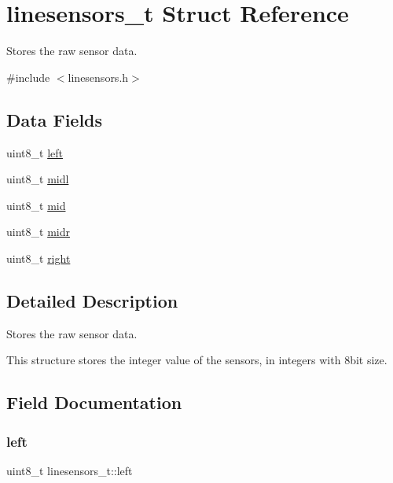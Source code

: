 \hypertarget{structlinesensors__t}{}\section{linesensors\+\_\+t Struct Reference}
\label{structlinesensors__t}


Stores the raw sensor data.  




{\ttfamily \#include $<$linesensors.\+h$>$}

\subsection*{Data Fields}
\begin{DoxyCompactItemize}
\item 
uint8\+\_\+t \hyperlink{structlinesensors__t_ad11a86c23d95d4ba499db331a10e730a}{left}
\item 
uint8\+\_\+t \hyperlink{structlinesensors__t_ad6c8d2412227ccbd1e89e27f92e470b1}{midl}
\item 
uint8\+\_\+t \hyperlink{structlinesensors__t_ad9a25cdd83f3ad042741b945b8e33a8c}{mid}
\item 
uint8\+\_\+t \hyperlink{structlinesensors__t_a640beadb77352d1a7bdadcb33134a9b5}{midr}
\item 
uint8\+\_\+t \hyperlink{structlinesensors__t_ab0c1d5879e4283814d84331c93b63d74}{right}
\end{DoxyCompactItemize}


\subsection{Detailed Description}
Stores the raw sensor data. 

This structure stores the integer value of the sensors, in integers with 8bit size. 

\subsection{Field Documentation}
\mbox{\label{structlinesensors__t_ad11a86c23d95d4ba499db331a10e730a}} 
\subsubsection{\texorpdfstring{left}{left}}
{\footnotesize\ttfamily uint8\+\_\+t linesensors\+\_\+t\+::left}

